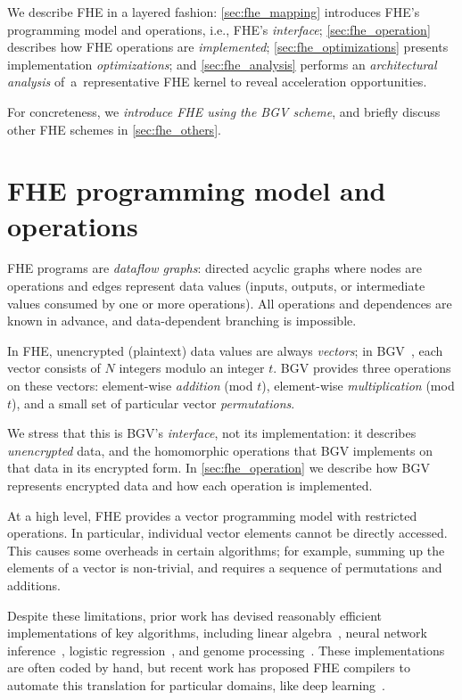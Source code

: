 We describe FHE in a layered fashion:
\autoref{sec:fhe_mapping} introduces FHE's programming model and operations, i.e., FHE's \emph{interface};
\autoref{sec:fhe_operation} describes how FHE operations are \emph{implemented};
\autoref{sec:fhe_optimizations} presents implementation \emph{optimizations};
and \autoref{sec:fhe_analysis} performs an \emph{architectural analysis}
of~a~representative FHE kernel to reveal acceleration opportunities.

For concreteness, we \emph{introduce FHE using the BGV scheme}, and briefly discuss other FHE schemes in \autoref{sec:fhe_others}.


\section{FHE programming model and operations}
\label{sec:fhe_mapping}

FHE programs are \emph{dataflow graphs}: directed acyclic graphs where nodes are operations and edges represent data values
(inputs, outputs, or intermediate values consumed by one or more operations).
All operations and dependences are known in advance, and data-dependent branching is impossible.

In FHE, unencrypted (plaintext) data values are always \emph{vectors};
in BGV~\cite{brakerski:toct14:leveled}, each vector consists of $N$
integers modulo an integer $t$.  BGV provides three operations on
these vectors: element-wise \emph{addition} (mod $t$), element-wise
\emph{multiplication} (mod $t$), and a small set of particular
vector \emph{permutations}.

We stress that this is BGV's \emph{interface}, not its implementation:
it describes \emph{unencrypted} data, and the homomorphic operations
that BGV implements on that data in its encrypted form.  In
\autoref{sec:fhe_operation} we describe how BGV represents encrypted
data and how each operation is implemented.

At a high level, FHE provides a vector programming model with restricted operations. In particular, individual vector elements cannot be directly accessed.  This causes some overheads in certain
algorithms; for example, summing up the elements of a vector is non-trivial,
and requires a sequence of permutations and additions.

Despite these limitations, prior work has devised reasonably efficient implementations of key algorithms,
including linear algebra~\cite{halevi:crypto14:algorithms},
neural network inference~\cite{brutzkus:icml19:low, gilad:icml16:cryptonets}, 
logistic regression~\cite{han:iacr18:efficient}, and genome processing~\cite{blatt:nas20:secure}.
These implementations are often coded by hand, but recent work has proposed FHE compilers to automate
this translation for particular domains, like deep learning~\cite{dathathri:pldi19:chet,dathathri:pldi20:eva}.

